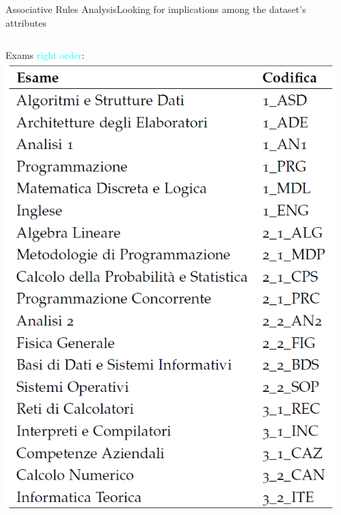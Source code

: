 \begin{frame}{Associative Rules Analysis}{Looking for implications among the dataset's attributes}
\vspace{0.3cm}
\begin{columns}
\begin{column}{0.5\textwidth}
    \hspace{0.6cm}Exams \textcolor{cyan}{right order}:\\
    \vspace*{0.3cm}
    \hspace*{0.2cm}\includegraphics[scale=0.20]{seq1.png}
\end{column}
\begin{column}{0.5\textwidth}

\end{column}
\end{columns}
\end{frame}
